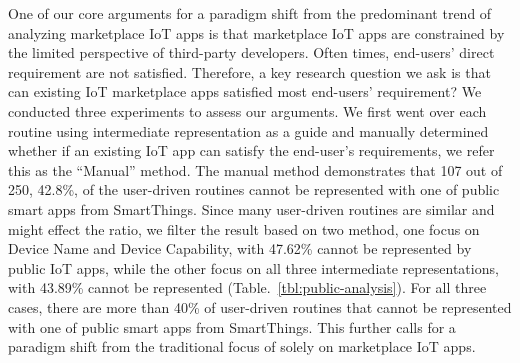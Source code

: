 
One of our core arguments for a paradigm shift from the predominant trend of analyzing marketplace IoT apps is that marketplace IoT apps are constrained by the limited perspective of third-party developers. Often times, end-users' direct requirement are not satisfied. Therefore, a key research question we ask is that can existing IoT marketplace apps satisfied most end-users' requirement? 
We conducted three experiments to assess our arguments. We first went over each routine using intermediate representation as a guide and manually determined whether if an existing IoT app can satisfy the end-user's requirements, we refer this as the ``Manual'' method. The manual method demonstrates that 107 out of 250, 42.8\%, of the user-driven routines cannot be represented with one of public smart apps from SmartThings. Since many user-driven routines are similar and might effect the ratio, we filter the result based on two method, one focus on Device Name and Device Capability, with 47.62\% cannot be represented by public IoT apps, while the other focus on all three intermediate representations, with 43.89\% cannot be represented (Table.~\ref{tbl:public-analysis}). For all three cases, there are more than 40\% of user-driven routines that cannot be represented with one of public smart apps from SmartThings. This further calls for a paradigm shift from the traditional focus of solely on marketplace IoT apps.











